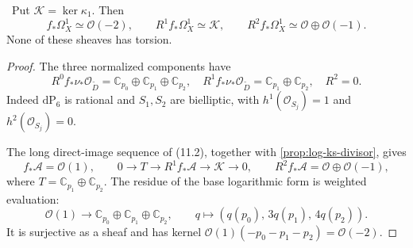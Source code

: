 \begin{proposition}
\label{prop:absolute-cotangent-direct-images}
\Verified\ Put $\mathcal K=\ker\kappa_1$.  Then
\[
 f_*\Omega_X^1\simeq\mathcal O(-2),\qquad
 R^1f_*\Omega_X^1\simeq\mathcal K,\qquad
 R^2f_*\Omega_X^1\simeq\mathcal O\oplus\mathcal O(-1).
\tag{11.13}
\]
None of these sheaves has torsion.
\end{proposition}

\begin{proof}
The three normalized components have
\[
 R^0f_*\nu_*\mathcal O_{\widetilde D}
  =\mathbb C_{p_0}\oplus\mathbb C_{p_1}\oplus\mathbb C_{p_2},
 \quad
 R^1f_*\nu_*\mathcal O_{\widetilde D}
  =\mathbb C_{p_1}\oplus\mathbb C_{p_2},
 \quad R^2=0.
\tag{11.14}
\]
Indeed $\mathrm{dP}_6$ is rational and $S_1,S_2$ are bielliptic, with
$h^1(\mathcal O_{S_j})=1$ and $h^2(\mathcal O_{S_j})=0$.

The long direct-image sequence of (11.2), together with
\cref{prop:log-ks-divisor}, gives
\[
 f_*\mathcal A=\mathcal O(1),\qquad
 0\longrightarrow T\longrightarrow R^1f_*\mathcal A
 \longrightarrow\mathcal K\longrightarrow0,
 \qquad R^2f_*\mathcal A=\mathcal O\oplus\mathcal O(-1),
\tag{11.15}
\]
where $T=\mathbb C_{p_1}\oplus\mathbb C_{p_2}$.
The residue of the base logarithmic form is weighted evaluation:
\[
 \mathcal O(1)\longrightarrow
 \mathbb C_{p_0}\oplus\mathbb C_{p_1}\oplus\mathbb C_{p_2},
 \qquad q\longmapsto(q(p_0),\,3q(p_1),\,4q(p_2)).
\tag{11.16}
\]
It is surjective as a sheaf and has kernel
$\mathcal O(1)(-p_0-p_1-p_2)=\mathcal O(-2)$.


\end{proof}
